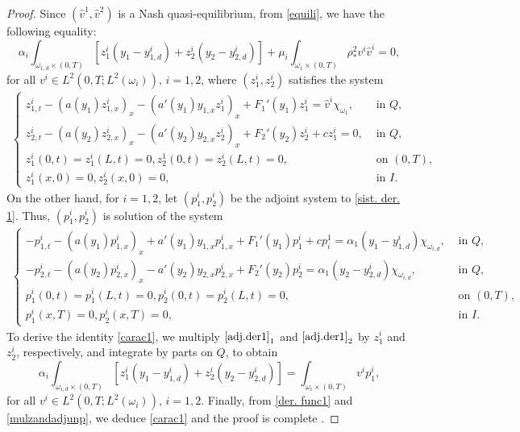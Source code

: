 \documentclass[11pt,a4paper]{amsart}
\numberwithin{equation}{section}
\begin{document}
\begin{proof}

Since $(\widehat{v}^1, \widehat{v}^2)$  is a Nash quasi-equilibrium, from \eqref{equili}, we have the following equality:
\begin{equation}\label{der. func1}
\alpha_i\int_{\omega_{1,d}\times (0,T)} \left[ z^i_1(y_1-y^i_{1,d})+ z^i_2(y_2-y^i_{2,d}) \right]+\mu_i\int_{\omega_{1}\times (0,T)} \rho_*^2 v^i\widehat{v}^i=0,
\end{equation}for all ${v}^i \in  L^2(0,T;L^2(\omega_i))$, $i=1, 2$, where $(z_1^i,z_2^i)$ satisfies the system
\begin{align} \label{sist. der. 1}
		\begin{cases}		
			z^i_{1,t}-(a(y_1)z^i_{1,x})_x -(a'(y_1)y_{1,x}z^i_1)_x+F_1'(y_1)z^i_1   = \widehat{v}^i\chi_{\omega_1},&\text{ in } Q,\\  
			z^i_{2,t}-(a(y_2)z^i_{2,x})_x -(a'(y_2)y_{2,x}z^i_2)_x+F_2'(y_2)z^i_2  +cz^i_1 = 0, &\text{ in } Q,\\  
			z^i_1(0,t) = z^i_1(L,t) =0, z^1_2(0,t) = z^i_2(L,t) = 0, &\text{ on } (0,T),\\
			z^i_1(x,0) = 0, z^i_2(x,0) = 0, &\text{ in } I.
		\end{cases}
	\end{align}On the other hand, for $i=1, 2$, let $(p^i_1, p^i_2)$ be the  adjoint system  to \eqref{sist. der. 1}. Thus, $(p^i_1, p^i_2)$ is solution of the system
    \begin{align}\label{adj.der1}
		\begin{cases}		
			-p^i_{1,t}-(a(y_1)p^i_{1,x})_x +a'(y_1)y_{1,x}p^i_{1,x}+F_1'(y_1)p^i_1 +cp_i^1  =  \alpha_1(y_1-y^i_{1,d})\chi_{\omega_{i,d}},  &\text{ in } Q,\\  
			-p^i_{2,t}-(a(y_2)p^i_{2,x})_x -a'(y_2)y_{2,x}p^i_{2,x}+F_2'(y_2)p^i_2   = \alpha_1(y_2-y^i_{2,d})\chi_{\omega_{i,d}}, &\text{ in } Q,\\  
			p^i_1(0,t) = p^i_1(L,t) =0, p^i_2(0,t) = p^i_2(L,t) = 0, &\text{ on } (0,T),\\
			p^i_1(x,T) = 0, p^i_2(x,T) = 0, &\text{ in } I.
		\end{cases}
	\end{align}To derive the identity \eqref{carac1}, we multiply $\eqref{adj.der1}_1$ and $\eqref{adj.der1}_2$ by $z^i_1$ and $z^i_2$, respectively, and integrate by parts on $Q$, to obtain
\begin{equation}\label{mulzandadjunp}
\alpha_i\int_{\omega_{i,d}\times (0,T)} \left[z^i_1(y_1-y^i_{1,d})+z^i_2(y_2-y^i_{2,d})\right]=\int_{\omega_{i}\times (0,T)} v^i  p_1^i,
\end{equation}for all ${v}^i \in  L^2(0,T;L^2(\omega_i))$, $i=1, 2$. Finally, from \eqref{der. func1} and \eqref{mulzandadjunp}, we deduce \eqref{carac1} and  the proof is complete .
\end{proof}
\end{document}
